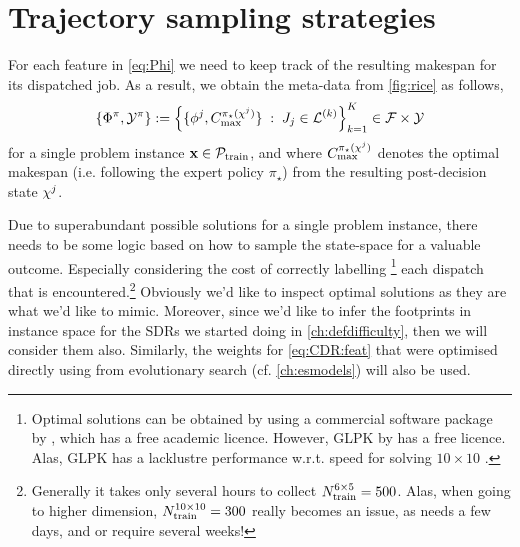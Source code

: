 \section{Trajectory sampling strategies}\label{sec:trdat:tracks}
For each feature in \cref{eq:Phi} we need to keep track of the resulting 
makespan for its dispatched job. 
As a result, we obtain the meta-data from 
\cref{fig:rice} as follows, 
\begin{equation}\label{eq:trdat:metadata}
\{\Phi^\pi,\mathcal{Y}^\pi\} := 
\condset{\{ \vphi^j, C_{\max}^{\pi_\star(\vchi^j)}
    \}}{J_j\in\mathcal{L}^{(k)}}_{k=1}^K \in \mathcal{F} \times \mathcal{Y}
\end{equation}
for a single problem instance $\mathbf{x}\in\mathcal{P}_{\text{train}}$, and where 
$C_{\max}^{\pi_\star({\mathbf{\chi}}^j)}$ denotes the optimal makespan (i.e. following 
the expert policy $\pi_\star$) from the resulting post-decision state ${\mathbf{\chi}}^j$.

Due to superabundant possible solutions for a single problem instance, 
there needs to be some logic based on how to sample the state-space for a 
valuable outcome. Especially considering the cost of correctly labelling 
\footnote{Optimal solutions can be obtained by using a commercial software 
    package by \citet{gurobi}, which has a free academic licence. However, GLPK 
    by \citet{glpk} has a free licence. Alas, GLPK has a lacklustre performance 
    w.r.t. speed for solving $10\times10$ \JSP.}
each dispatch that is encountered.\footnote{Generally it takes 
    only several hours to collect $N_{\text{train}}^{6\times5}=500$. Alas, when 
    going to higher dimension, $N_{\text{train}}^{10\times10}=300$ 
    really becomes an issue, as  needs a few days, and 
     or  require several weeks!}
Obviously we'd like to inspect optimal solutions as they are what we'd like to 
mimic. Moreover, since we'd like to infer the footprints in instance space for 
the SDRs we started doing in \cref{ch:defdifficulty}, then we will consider 
them also.
Similarly, the weights for \cref{eq:CDR:feat} that were optimised directly 
using from evolutionary search (cf. \cref{ch:esmodels}) will also be used.

